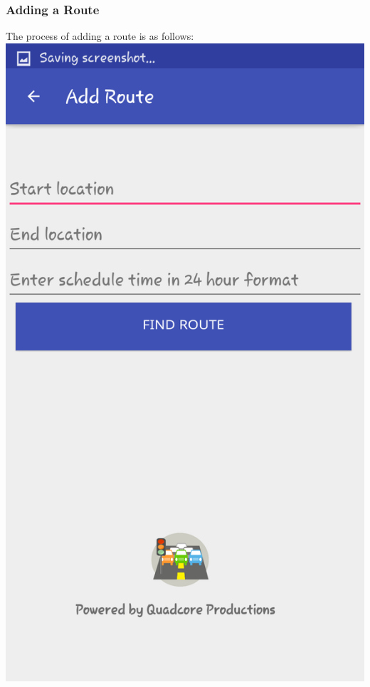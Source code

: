 \documentclass[a4paper,12pt]{article}
\begin{document}
\subsubsection{Adding a Route}
The process of adding a route is as follows:
\includegraphics[width=\textwidth]{images/AddRoute.png}
\end{document}
